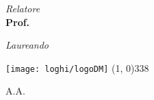 \begin{titlepage}
\begin{center}
\vspace*{8cm}


\begin{large}
\begin{flushleft}
\textit{Relatore}\\ 
\vspace{5pt} 
\textbf{Prof. \mySupervisor}
\end{flushleft}

\vspace*{-2.36cm} 

\begin{flushright}
\textit{Laureando}\\ 
\vspace{5pt} 
\textbf{\myName}
\end{flushright}
\end{large}


\vfill
\texttt{[image: loghi/logoDM]}
\line(1, 0){338} \\
\begin{normalsize}
\textsc{A.A. \myAA}
\end{normalsize}

\end{center}
\end{titlepage}
